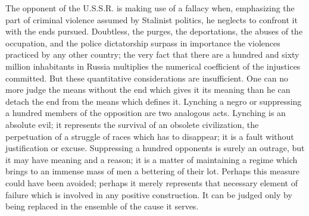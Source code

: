 \documentclass[11pt]{article}
\begin{document}
{{The opponent of the U.S.S.R. is making use of a fallacy when, emphasizing the part of criminal violence assumed by Stalinist politics, he neglects to confront it with the ends pursued. Doubtless, the purges, the deportations, the abuses of the occupation, and the police dictatorship surpass in importance the violences practiced by any other country; the very fact that there are a hundred and sixty million inhabitants in Russia multiplies the numerical coefficient of the injustices committed. But these quantitative considerations are insufficient. One can no more judge the means without the end which gives it its meaning than he can detach the end from the means which defines it. Lynching a negro or suppressing a hundred members of the opposition are two analogous acts. Lynching is an absolute evil; it represents the survival of an obsolete civilization, the perpetuation of a struggle of races which has to disappear; it is a fault without justification or excuse. Suppressing a hundred opponents is surely an outrage, but it may have meaning and a reason; it is a matter of maintaining a regime which brings to an immense mass of men a bettering of their lot. Perhaps this measure could have been avoided; perhaps it merely represents that necessary element of failure which is involved in any positive construction. It can be judged only by being replaced in the ensemble of the cause it serves.

}}
\end{document}
